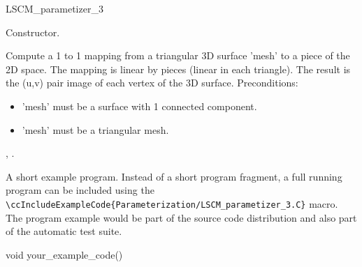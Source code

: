 \begin{ccRefClass}{LSCM_parametizer_3}
\ccCreation
{}  %

{
Constructor.
}


\ccOperations

{
Compute a 1 to 1 mapping from a triangular 3D surface 'mesh' to a piece of the 2D space. The mapping is linear by pieces (linear in each triangle). The result is the (u,v) pair image of each vertex of the 3D surface.
Preconditions:\begin{itemize}
\item 'mesh' must be a surface with 1 connected component.\item 'mesh' must be a triangular mesh. \end{itemize}
}


\ccSeeAlso

,
.

\ccExample

A short example program.
Instead of a short program fragment, a full running program can be
included using the 
\verb|\ccIncludeExampleCode{Parameterization/LSCM_parametizer_3.C}| 
macro. The program example would be part of the source code distribution and
also part of the automatic test suite.

\begin{ccExampleCode}
void your_example_code() {
}
\end{ccExampleCode}


\end{ccRefClass}


